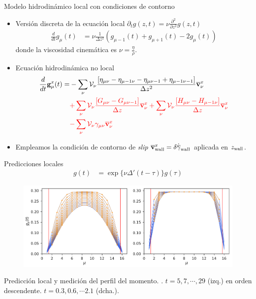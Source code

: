 \documentclass{beamer}
\begin{document}
\begin{frame}{Modelo hidrodinámico local con condiciones de contorno}  
  \begin{itemize}
    \item Versión discreta de la ecuación local $\partial_t g(z,t)=\nu\frac{\partial^2}{\partial z^2} g(z,t)$
\begin{align}
  \frac{d}{dt}g_\mu(t)&=\nu \frac{1}{\Delta z^2}(g_{\mu-1}(t)+g_{\mu+1}(t)-2g_{\mu}(t))
\nonumber
\end{align}
donde la viscosidad cinemática es $\nu=\frac{\eta}{\rho}$.
    \item Ecuación hidrodinámica no local 
\begin{align}
  \frac{d}{dt}{\bf g}^x_\mu(t)=&
-\sum_{\nu} {\cal V}_\nu \frac{\left[\eta_{\mu\nu}-\eta_{\mu-1\nu}-\eta_{\mu\nu-1}+\eta_{\mu-1\nu-1}\right]}{\Delta z^2}\overline{\bf v}^x_\nu \nonumber \\
  &{\color{red}+\sum_{\nu} {\cal V}_\nu\frac{\left[G_{\mu\nu}-G_{\mu\nu-1}\right]}{\Delta z}\overline{\bf v}^x_\nu
+\sum_{\nu} {\cal V}_\nu\frac{\left[H_{\mu\nu}-H_{\mu-1\nu}\right]}{\Delta z}
  \overline{\bf v}^x_\nu}
\nonumber \\
  &{\color{red}-\sum_{\nu} {\cal V}_\nu\gamma_{\mu\nu}\overline{\bf v}^x_\nu}
\nonumber
\end{align}
\item Empleamos la condición de contorno de \textit{slip} $\overline{\bf v}_{\rm wall}^x=\delta \dot{\overline{\gamma}}_{\rm wall}$ aplicada en $z_{\rm wall}$.
  \end{itemize}
\end{frame}



\begin{frame}{Predicciones locales}
\begin{align}
 g(t)&=\exp\{\nu \Delta' (t-\tau)\}g(\tau)
\nonumber
\end{align}
\begin{figure}[]
\includegraphics[width=\linewidth]{gxtLocalPrediction-17nodes-WALLS}
\end{figure}
  {\color{orange} Predicción local}
  y {\color{blue} medición} del perfil del momento. 
  . $t=5,7,\cdots,29$  (izq.) en orden descendente. $t=0.3,0.6,\cdots2.1$ (dcha.).
\end{frame}
\end{document}
